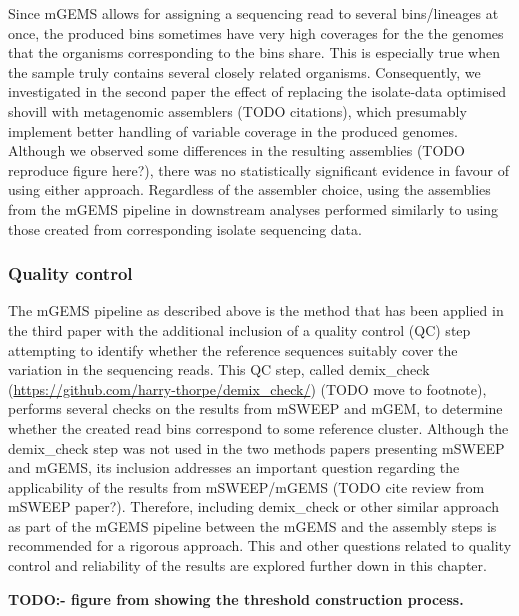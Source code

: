 \documentclass[officiallayout]{tktla}
\begin{document}
Since mGEMS allows for assigning a sequencing read to several
bins/lineages at once, the produced bins sometimes have very high
coverages for the the genomes that the organisms corresponding to the
bins share. This is especially true when the sample truly contains
several closely related organisms. Consequently, we investigated in
the second paper the effect of replacing the isolate-data optimised
shovill with metagenomic assemblers (TODO citations), which presumably
implement better handling of variable coverage in the produced
genomes. Although we observed some differences in the resulting
assemblies (TODO reproduce figure here?), there was no statistically
significant evidence in favour of using either approach. Regardless of
the assembler choice, using the assemblies from the mGEMS pipeline in
downstream analyses performed similarly to using those created from
corresponding isolate sequencing data.

\subsubsection{Quality control}

The mGEMS pipeline as described above is the method that has been
applied in the third paper with the additional inclusion of a quality
control (QC) step attempting to identify whether the reference
sequences suitably cover the variation in the sequencing reads. This
QC step, called demix\_check
(\url{https://github.com/harry-thorpe/demix_check/}) (TODO move to
footnote), performs several checks on the results from mSWEEP and
mGEM, to determine whether the created read bins correspond to some
reference cluster. Although the demix\_check step was not used in the
two methods papers presenting mSWEEP and mGEMS, its inclusion
addresses an important question regarding the applicability of the
results from mSWEEP/mGEMS (TODO cite review from mSWEEP
paper?). Therefore, including demix\_check \textemdash{ } or other
similar approach \textemdash{ } as part of the mGEMS pipeline between
the mGEMS and the assembly steps is recommended for a rigorous
approach. This and other questions related to quality control and
reliability of the results are explored further down in this chapter.

\textbf{TODO:- figure from showing the threshold construction process.}
\end{document}
